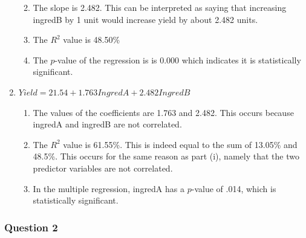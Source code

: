 \documentclass{article}
\providecommand{\tightlist}{%
      \setlength{\itemsep}{0pt}\setlength{\parskip}{0pt}}
\begin{document}
\begin{enumerate}
  \begin{enumerate}
  \def\labelenumii{\roman{enumii})}
  \tightlist
  \item
    The slope is 2.482. This can be interpreted as saying that
    increasing ingredB by 1 unit would increase yield by about 2.482
    units.
  \item
    The \(R^2\) value is 48.50\%
  \item
    The \(p\)-value of the regression is is 0.000 which indicates it is
    statistically significant.
  \end{enumerate}
\item
  \(Yield = 21.54 + 1.763 IngredA + 2.482 IngredB\)

  \begin{enumerate}
  \def\labelenumii{\roman{enumii})}
  \tightlist
  \item
    The values of the coefficients are 1.763 and 2.482. This occurs
    because ingredA and ingredB are not correlated.
  \item
    The \(R^2\) value is 61.55\%. This is indeed equal to the sum of
    13.05\% and 48.5\%. This occurs for the same reason as part (i),
    namely that the two predictor variables are not correlated.
  \item
    In the multiple regression, ingredA has a \(p\)-value of .014, which
    is statistically significant.
  \end{enumerate}
\end{enumerate}

    \subsubsection{Question 2}\label{question-2}
\end{document}

